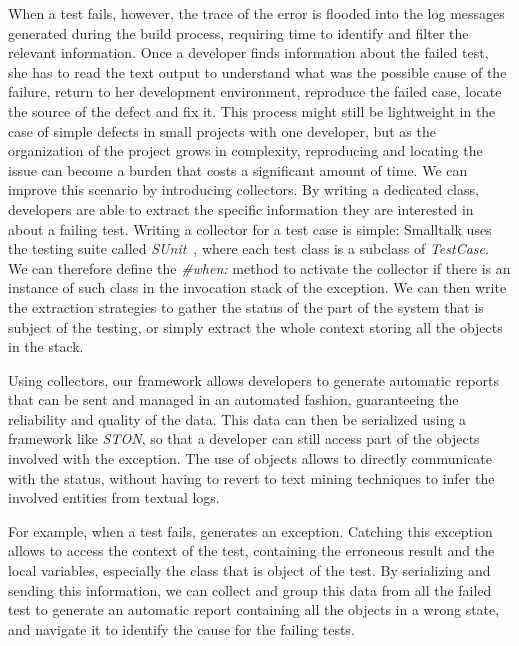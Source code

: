 When a test fails, however, the trace of the error is flooded into the log messages generated during the build process, requiring time to identify and filter the relevant information.
Once a developer finds information about the failed test, she has to read the text output to understand what was the possible cause of the failure, return to her development environment, reproduce the failed case, locate the source of the defect and fix it.
This process might still be lightweight in the case of simple defects in small projects with one developer, but as the organization of the project grows in complexity, reproducing and locating the issue can become a burden that costs a significant amount of time.
We can improve this scenario by introducing \sln collectors.
By writing a dedicated class, developers are able to extract the specific information they are interested in about a failing test.
Writing a collector for a test case is simple: Smalltalk uses the testing suite called \textit{SUnit}~\cite{Beck1994a}, where each test class is a subclass of \textit{TestCase}.
We can therefore define the \textit{\#when:} method to activate the collector if there is an instance of such class in the invocation stack of the exception.
We can then write the extraction strategies to gather the status of the part of the system that is subject of the testing, or simply extract the whole context storing all the objects in the stack.

Using collectors, our framework allows developers to generate automatic reports that can be sent and managed in an automated fashion, guaranteeing the reliability and quality of the data.
This data can then be serialized using a framework like \textit{STON}, so that a developer can still access part of the objects involved with the exception.
The use of objects allows to directly communicate with the status, without having to revert to text mining techniques to infer the involved entities from textual logs.

For example, when a test fails,  generates an  exception.
Catching this exception allows to access the context of the test, containing the erroneous result and the local variables, especially the class that is object of the test.
By serializing and sending this information, we can collect and group this data from all the failed test to generate an automatic report containing all the objects in a wrong state, and navigate it to identify the cause for the failing tests.

